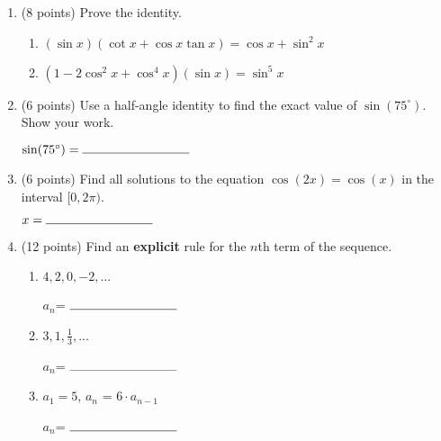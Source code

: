 \documentclass[11pt]{article}
\begin{document}
\begin{enumerate}
\vspace{120pt}

\item (8 points) Prove the identity.
\begin{enumerate}[itemsep=140pt, label={\alph*)}]
    \item $\displaystyle (\sin x)(\cot x + \cos x \tan x) = \cos x + \sin^2 x$
    \item $\displaystyle (1-2\cos^2 x + \cos^4 x)(\sin x) = \sin^5 x$
\end{enumerate}

\newpage

\item (6 points) Use a half-angle identity to find the exact value of $\sin(75^{\circ})$. Show your work.
\vspace{100pt}
\begin{flushright}
$\sin(75^{\circ})= \rule{3cm}{0.4pt}$
\end{flushright}
\vspace{20pt}

\item (6 points) Find all solutions to the equation $\cos(2x) = \cos(x)$ in the interval $[0,2\pi )$.
\vspace{100pt}
\begin{flushright}
$x= \rule{3cm}{0.4pt}$
\end{flushright}
\vspace{20pt}


\item (12 points) Find an \textbf{explicit} rule for the $n$th term of the sequence.
\begin{enumerate}[itemsep=30pt, label={\alph*)}]
\item $4, 2, 0, -2, ...$
\begin{flushright}
$a_n$= $\rule{3cm}{0.4pt}$
\end{flushright}
\item $3, 1, \frac{1}{3}, ...$
\begin{flushright}
$a_n$= $\rule{3cm}{0.4pt}$
\end{flushright}
\item $a_1 = 5$, $a_n$ = $6 \cdot a_{n-1}$
\begin{flushright}
$a_n$= $\rule{3cm}{0.4pt}$
\end{flushright}
\end{enumerate}

\newpage


\end{enumerate}
\end{document}
